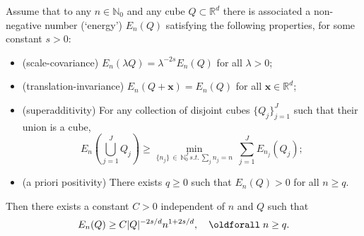 \documentclass[AHL, Unicode, longabstracts, published]{cedram}
\newcommand*\R {\mathbb{R}}
\newcommand\1{{\ensuremath {\mathds 1} }}
\newcommand{\bx}{\mathbf{x}}
\renewcommand*{\forall}{\mathrel{\oldforall}}
\begin{document}
\begin{lemm}\label{lem:energy}
Assume that to any $n\in \mathbb{N}_0$ and any cube $Q\subset \R^d$ there is associated a non-negative number (`energy') $E_n(Q)$ satisfying the following properties, for some constant $s>0$:
\begin{itemize}
\item (scale-covariance) $E_n(\lambda Q) = \lambda^{-2s} E_n(Q)$ for all $\lambda > 0$;
\item (translation-invariance) $E_n(Q+\bx) = E_n(Q)$ for all $\bx \in \R^d$;
\item (superadditivity) For any collection of disjoint cubes $\{Q_j\}_{j=1}^J$ such that their union is a cube,
\[
E_n\left(\bigcup_{j=1}^J Q_j\right) \ge \min_{\{n_j\}\,\in\,\mathbb{N}_0^J \, s.t.\, \sum_j n_j = n}\ \sum_{j=1}^J E_{n_j}(Q_j) ;
\]
\item (a priori positivity) There exists $q \ge 0$ such that $E_n(Q) > 0$ for all $n \ge q$.
\end{itemize}
Then there exists a constant $C>0$ independent of $n$ and $Q$ such that
\begin{equation}\label{eq:energy-bound}
E_n(Q) \ge C |Q|^{-2s/d} n^{1+2s/d}, \quad \forall n\ge q.
\end{equation}
\end{lemm}
\end{document}
